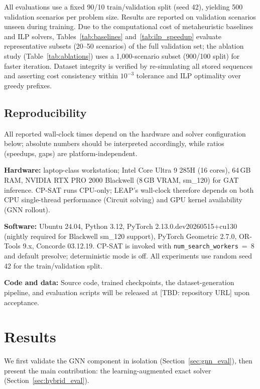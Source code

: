 \documentclass[conference]{IEEEtran}
\begin{document}
All evaluations use a fixed 90/10 train/validation split (seed 42), yielding 500 validation scenarios per problem size. Results are reported on validation scenarios unseen during training. Due to the computational cost of metaheuristic baselines and ILP solvers, Tables~\ref{tab:baselines} and~\ref{tab:ilp_speedup} evaluate representative subsets (20--50 scenarios) of the full validation set; the ablation study (Table~\ref{tab:ablations}) uses a 1{,}000-scenario subset (900/100 split) for faster iteration. Dataset integrity is verified by re-simulating all stored sequences and asserting cost consistency within $10^{-3}$ tolerance and ILP optimality over greedy prefixes.

\subsection{Reproducibility}\label{sec:reproducibility}

All reported wall-clock times depend on the hardware and solver configuration below; absolute numbers should be interpreted accordingly, while ratios (speedups, gaps) are platform-independent.

\textbf{Hardware:} laptop-class workstation; Intel Core Ultra 9 285H (16 cores), 64\,GB RAM, NVIDIA RTX PRO 2000 Blackwell (8\,GB VRAM, sm\_120) for GAT inference. CP-SAT runs CPU-only; LEAP's wall-clock therefore depends on both CPU single-thread performance (Circuit solving) and GPU kernel availability (GNN rollout).

\textbf{Software:} Ubuntu 24.04, Python 3.12, PyTorch 2.13.0.dev20260515+cu130 (nightly required for Blackwell sm\_120 support), PyTorch Geometric 2.7.0, OR-Tools 9.x, Concorde 03.12.19. CP-SAT is invoked with \texttt{num\_search\_workers}~=~8 and default presolve; deterministic mode is off. All experiments use random seed 42 for the train/validation split.

\textbf{Code and data:} Source code, trained checkpoints, the dataset-generation pipeline, and evaluation scripts will be released at [TBD: repository URL] upon acceptance.

\section{Results}\label{sec:results}

We first validate the GNN component in isolation (Section~\ref{sec:gnn_eval}), then present the main contribution: the learning-augmented exact solver (Section~\ref{sec:hybrid_eval}).
\end{document}
